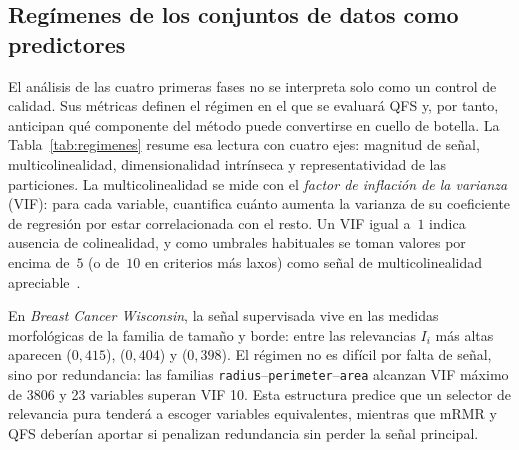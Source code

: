 \subsection{Regímenes de los conjuntos de datos como predictores}
\label{sec:regimenes-predictor}

El análisis de las cuatro primeras fases no se interpreta solo como un
control de calidad. Sus métricas definen el régimen en el que se evaluará
QFS y, por tanto, anticipan qué componente del método puede convertirse
en cuello de botella. La Tabla~\ref{tab:regimenes} resume esa lectura
con cuatro ejes:
magnitud de señal, multicolinealidad, dimensionalidad intrínseca y
representatividad de las particiones. La multicolinealidad se mide con el
\emph{factor de inflación de la varianza} (VIF): para cada variable,
cuantifica cuánto aumenta la varianza de su coeficiente de regresión por
estar correlacionada con el resto. Un VIF igual a~$1$ indica ausencia de
colinealidad, y como umbrales habituales se toman valores por encima
de~$5$ (o de~$10$ en criterios más laxos) como señal de
multicolinealidad apreciable~\cite{james2013}.

\begin{table}[!htbp]
  \centering
  \caption[Regímenes del dato antes de QFS]{Regímenes del dato antes de
    ejecutar QFS\@. El efecto mediano resume la magnitud de la señal
    supervisada; el VIF máximo y el número de variables con VIF$\ge10$
    miden la multicolinealidad; los componentes principales para explicar
    el 80\,\% de la varianza aproximan la dimensionalidad intrínseca. Las
    dos formulaciones de \textit{Olive Oil} comparten predictoras.}
  \label{tab:regimenes}
  \scriptsize
\end{table}
\FloatBarrier

En \textit{Breast Cancer Wisconsin}, la señal supervisada vive en las
medidas morfológicas de la familia de tamaño y borde: entre las
relevancias $I_i$ más altas aparecen
 ($0{,}415$),
 ($0{,}404$) y
 ($0{,}398$). El régimen no es difícil por
falta de señal, sino por redundancia: las familias
\texttt{radius}--\texttt{perimeter}--\texttt{area} alcanzan VIF máximo
de 3806 y 23 variables superan VIF 10. Esta estructura predice que un
selector de relevancia pura tenderá a escoger variables equivalentes,
mientras que mRMR y QFS deberían aportar si penalizan redundancia sin
perder la señal principal.

